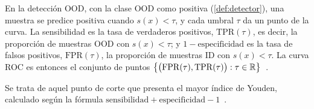 En la detección OOD, con la clase OOD como positiva (\cref{def:detector}), una muestra se predice positiva cuando $s(x) < \tau$, y cada umbral $\tau$ da un punto de la curva. La sensibilidad es la tasa de verdaderos positivos, $\mathrm{TPR}(\tau)$, es decir, la proporción de muestras OOD con $s(x) < \tau$; y $1 - \text{especificidad}$ es la tasa de falsos positivos, $\mathrm{FPR}(\tau)$, la proporción de muestras ID con $s(x) < \tau$. La curva ROC es entonces el conjunto de puntos $\bigl\{\bigl(\mathrm{FPR}(\tau), \mathrm{TPR}(\tau)\bigr) : \tau \in \mathbb{R}\bigr\}$~\cite[sec.~4]{fawcett2006}.

\begin{definicion}\label{def:youden}
Se trata de aquel punto de corte que presenta el mayor índice de Youden, calculado según la fórmula $\text{sensibilidad} + \text{especificidad} - 1$~\cite{cerda2012roc}.
\end{definicion}

